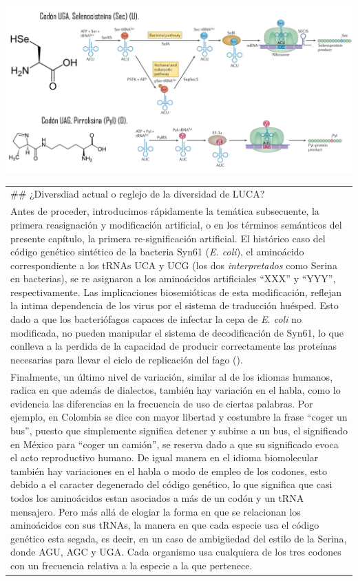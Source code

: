 \documentclass[
  12pt, krantz2,
  spanish,
]{krantz}
\begin{document}
\includegraphics{figures/21y22AA.png}

\begin{longtable}[]{@{}
  >{\raggedright\arraybackslash}p{}@{}}
\toprule
\endhead
\#\# ¿Diversdiad actual o reglejo de la diversidad de LUCA? \\
Antes de proceder, introducimos rápidamente la temática subsecuente, la primera reasignación y modificación artificial, o en los términos semánticos del presente capítulo, la primera re-significación artificial. El histórico caso del código genético sintético de la bacteria Syn61 (\emph{E. coli}), el aminoácido correspondiente a los tRNAs UCA y UCG (los dos \emph{interpretados} como Serina en bacterias), se re asignaron a los aminoácidos artificiales ``XXX'' y ``YYY'', respectivamente. Las implicaciones biosemióticas de esta modificación, reflejan la intima dependencia de los virus por el sistema de traducción huésped. Esto dado a que los bacteriófagos capaces de infectar la cepa de \emph{E. coli} no modificada, no pueden manipular el sistema de decodificación de Syn61, lo que conlleva a la perdida de la capacidad de producir correctamente las proteínas necesarias para llevar el ciclo de replicación del fago (\citet{robertson2021sense}). \\
Finalmente, un último nivel de variación, similar al de los idiomas humanos, radica en que además de dialectos, también hay variación en el habla, como lo evidencia las diferencias en la frecuencia de uso de ciertas palabras. Por ejemplo, en Colombia se dice con mayor libertad y costumbre la frase ``coger un bus'', puesto que simplemente significa detener y subirse a un bus, el significado en México para ``coger un camión'', se reserva dado a que su significado evoca el acto reproductivo humano. De igual manera en el idioma biomolecular también hay variaciones en el habla o modo de empleo de los codones, esto debido a el caracter degenerado del código genético, lo que significa que casi todos los aminoácidos estan asociados a más de un codón y un tRNA mensajero. Pero más allá de elogiar la forma en que se relacionan los aminoácidos con sus tRNAs, la manera en que cada especie usa el código genético esta segada, es decir, en un caso de ambigüedad del estilo de la Serina, donde AGU, AGC y UGA. Cada organismo usa cualquiera de los tres codones con un frecuencia relativa a la especie a la que pertenece. \\

\end{longtable}
\end{document}
